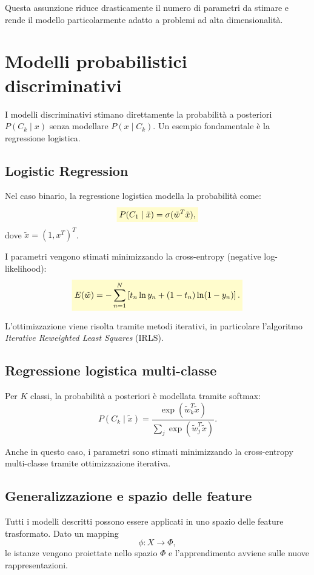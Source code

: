 \documentclass[a4paper,12pt]{report}
\newcommand{\highlight}[1]{%
\colorbox{yellow!20}{$\displaystyle #1$}%
}
\begin{document}
Questa assunzione riduce drasticamente il numero di parametri da stimare e rende il modello particolarmente adatto a problemi ad alta dimensionalità.

\section{Modelli probabilistici discriminativi}

I modelli discriminativi stimano direttamente la probabilità a posteriori \( P(C_k \mid x) \) senza modellare \( P(x \mid C_k) \).
Un esempio fondamentale è la regressione logistica.

\subsection{Logistic Regression}

Nel caso binario, la regressione logistica modella la probabilità come:
\[
\highlight{
P(C_1 \mid \tilde{x}) = \sigma(\tilde{w}^T \tilde{x}),}
\]
dove \( \tilde{x} = (1, x^T)^T \).

I parametri vengono stimati minimizzando la cross-entropy (negative log-likelihood):
\[
\highlight{
E(\tilde{w}) = -\sum_{n=1}^N \left[
t_n \ln y_n + (1-t_n)\ln(1-y_n)
\right].}
\]

L’ottimizzazione viene risolta tramite metodi iterativi, in particolare l’algoritmo \textit{Iterative Reweighted Least Squares} (IRLS).

\subsection{Regressione logistica multi-classe}

Per \( K \) classi, la probabilità a posteriori è modellata tramite softmax:
\[
P(C_k \mid \tilde{x}) =
\frac{\exp(\tilde{w}_k^T \tilde{x})}
{\sum_j \exp(\tilde{w}_j^T \tilde{x})}.
\]

Anche in questo caso, i parametri sono stimati minimizzando la cross-entropy multi-classe tramite ottimizzazione iterativa.

\subsection{Generalizzazione e spazio delle feature}

Tutti i modelli descritti possono essere applicati in uno spazio delle feature trasformato.
Dato un mapping
\[
\phi : X \rightarrow \Phi,
\]
le istanze vengono proiettate nello spazio \( \Phi \) e l’apprendimento avviene sulle nuove rappresentazioni.
\end{document}
